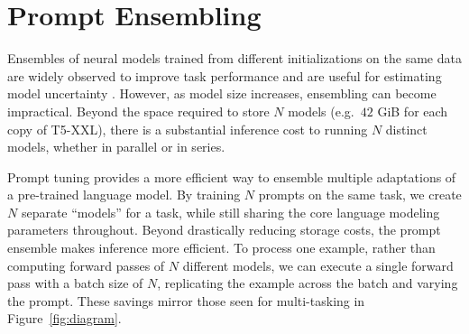 \documentclass[11pt]{article}
\begin{document}
\section{Prompt Ensembling}
\label{sec:ensemble}

Ensembles of neural models trained from different initializations on the same data are widely observed to improve task performance \cite{hansen_1990_ensembles} and are useful for estimating model uncertainty \cite{lakshminarayanan_2017_deep_ensembles}. However, as model size increases, ensembling can become impractical. Beyond the space required to store $N$ models (e.g.\ $42$ GiB for each copy of T5-XXL), there is a substantial inference cost to running $N$ distinct models, whether in parallel or in series.

Prompt tuning provides a more efficient way to ensemble multiple adaptations of a pre-trained language model. By training $N$ prompts on the same task, we create $N$ separate ``models'' for a task, while still sharing the core language modeling parameters throughout. Beyond drastically reducing storage costs, the prompt ensemble makes inference more efficient. To process one example, rather than computing forward passes of $N$ different models, we can execute a single forward pass with a batch size of $N$, replicating the example across the batch and varying the prompt. These savings mirror those seen for multi-tasking in Figure~\ref{fig:diagram}.
\end{document}
